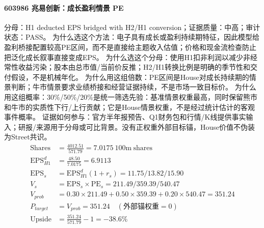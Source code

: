 \paragraph{603986 兆易创新：成长盈利情景 PE}
分母：H1 deducted EPS bridged with H2/H1 conversion；证据质量：中高；审计状态：PASS。
为什么选这个方法：电子具有成长或盈利持续期特征，因此模型给盈利桥接配置较高PE区间，而不是直接给主题收入估值；价格和现金流检查防止把泛化成长叙事直接变成EPS。
为什么选这个分母：使用H1扣非利润以减少非经常性收益污染；股本由总市值/当前价反推；H2/H1转换比例是明确的季节性和交付假设，不是机械年化。
为什么用这组倍数：PE区间是House对成长持续期的情景判断；牛市情景要求业绩桥接和经营证据持续，不是市场一致目标价。
为什么用这组概率：30\%/50\%/20\%是统一筛选先验：基准情景权重最高，同时保留熊市和牛市的实质性下行/上行贡献；它是House情景权重，不是经过统计估计的客观事件概率。
证据如何参与：官方半年报预告、Q1财务包和行情/K线提供事实输入；研报/来源用于分母或可比背景。没有正权重外部目标锚，House价值不伪装为Street共识。
\begin{align*}
\mathrm{Shares} &= \frac{4012.51}{571.79}=7.0175\ \mathrm{100m\ shares}\\
\mathrm{EPS}_{H1}^d &= \frac{48.50}{7.0175}=6.9113\\
\mathrm{EPS}_s &= \mathrm{EPS}_{H1}^d(1+r_s)=11.75/13.82/15.90\\
V_s &= \mathrm{EPS}_s\times \mathrm{PE}_s=211.49/359.39/540.47\\
V_{prob} &= 0.30\times 211.49+0.50\times 359.39+0.20\times 540.47=351.24\\
P_{target} &= V_{prob}=351.24\quad(\text{外部锚权重}=0)\\
\mathrm{Upside} &= \frac{351.24}{571.79}-1=-38.6\%\\
\end{align*}

